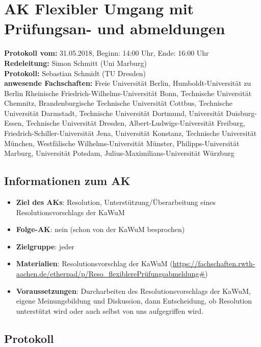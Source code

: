 
\section{AK Flexibler Umgang mit Prüfungsan- und abmeldungen}

  \textbf{Protokoll vom:} 31.05.2018,
  Beginn: 14:00 Uhr,
  Ende: 16:00 Uhr \\
  \textbf{Redeleitung:} Simon Schmitt (Uni Marburg) \\
  \textbf{Protokoll:} Sebastian Schmidt (TU Dresden) \\
  \textbf{anwesende Fachschaften:} Freie Universität Berlin, Humboldt-Universität zu Berlin Rheinische Friedrich-Wilhelms-Universität Bonn, Technische Universität Chemnitz, Brandenburgische Technische Universität Cottbus, Technische Universität Darmstadt, Technische Universität Dortmund, Universität Duisburg-Essen, Technische Universität Dresden, Albert-Ludwigs-Universität Freiburg, Friedrich-Schiller-Universität Jena, Universität Konstanz, Technische Universität München, Westfälische Wilhelms-Universität Münster, Philipps-Universität Marburg, Universität Potsdam, Julius-Maximilians-Universität Würzburg

  \subsection*{Informationen zum AK}
    \begin{itemize}
      \item \textbf{Ziel des AKs}: Resolution, Unterstützung/Überarbeitung eines Resolutionsvorschlags der KaWuM
      \item \textbf{Folge-AK}: nein (schon von der KaWuM besprochen)
      \item \textbf{Zielgruppe}: jeder
      \item \textbf{Materialien}: Resolutionsvorschlag der KaWuM (\url{https://fachschaften.rwth-aachen.de/etherpad/p/Reso_flexiblerePrüfungsabmeldung#})
      \item \textbf{Voraussetzungen}: Durcharbeiten des Resolutionsvorschlags der KaWuM, eigene Meinungsbildung und Diskussion, dann Entscheidung, ob Resolution unterstützt wird oder auch selbst von uns aufgegriffen wird.
    \end{itemize}

  \subsection*{Protokoll}
